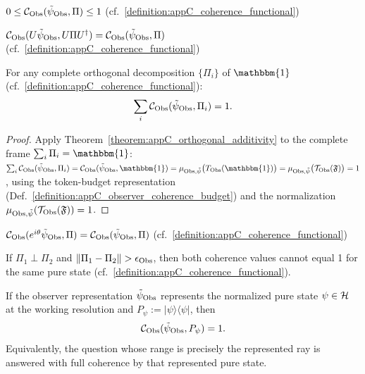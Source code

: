 \begin{axiom}[PS--C1 (Boundedness)]
\label{axiom:appC_psc1}
$0 \leq \mathcal{C}_{\mathrm{Obs}}(\tilde\psi_{\mathrm{Obs}}, \Pi) \leq 1$ \quad (cf.~\ref{definition:appC_coherence_functional})
\end{axiom}

\begin{axiom}
\label{axiom:appC_psc2}
$\mathcal{C}_{\mathrm{Obs}}(U \tilde\psi_{\mathrm{Obs}}, U \Pi U^\dagger)
= \mathcal{C}_{\mathrm{Obs}}(\tilde\psi_{\mathrm{Obs}}, \Pi)$ \quad (cf.~\ref{definition:appC_coherence_functional})
\end{axiom}

\begin{corollary}
\label{axiom:appC_psc3}
For any complete orthogonal decomposition $\{\Pi_i\}$ of $\mathbbm{1}$ (cf.~\ref{definition:appC_coherence_functional}):
\[
\sum_i \mathcal{C}_{\mathrm{Obs}}(\tilde\psi_{\mathrm{Obs}}, \Pi_i) = 1.
\]
\end{corollary}

\begin{proof}
\label{proof:appC_psc3}
Apply Theorem~\ref{theorem:appC_orthogonal_additivity} to the complete frame
$\sum_i \Pi_i = \mathbbm{1}$:
$\sum_i \mathcal{C}_{\Obs}(\tilde\psi_{\Obs}, \Pi_i)
= \mathcal{C}_{\Obs}(\tilde\psi_{\Obs}, \mathbbm{1})
= \mu_{\Obs,\tilde\psi}\big(T_\Obs(\mathbbm{1})\big)
= \mu_{\Obs,\tilde\psi}\big(\mathcal{T}_\Obs(\mathfrak{F})\big) = 1$,
using the token-budget representation
(Def.~\ref{definition:appC_observer_coherence_budget}) and the normalization
$\mu_{\mathrm{Obs},\tilde\psi}(\mathcal{T}_{\mathrm{Obs}}(\mathfrak{F})) = 1$.
\end{proof}

\begin{axiom}
\label{axiom:appC_psc4}
$\mathcal{C}_{\mathrm{Obs}}(e^{i\theta} \tilde\psi_{\mathrm{Obs}}, \Pi)
= \mathcal{C}_{\mathrm{Obs}}(\tilde\psi_{\mathrm{Obs}}, \Pi)$ \quad (cf.~\ref{definition:appC_coherence_functional})
\end{axiom}

\begin{axiom}
\label{axiom:appC_psc5}
If $\Pi_1 \perp \Pi_2$ and $\| \Pi_1 - \Pi_2 \| > \epsilon_{\mathrm{Obs}}$,
then both coherence values cannot equal 1 for the same pure state (cf.~\ref{definition:appC_coherence_functional}).
\end{axiom}

\begin{axiom}
\label{axiom:appC_psc6}
If the observer representation $\tilde\psi_{\mathrm{Obs}}$ represents the normalized pure
state $\psi\in\mathcal{H}$ at the working resolution and
$P_\psi:=|\psi\rangle\langle\psi|$, then
\[
\mathcal{C}_{\mathrm{Obs}}(\tilde\psi_{\mathrm{Obs}},P_\psi)=1.
\]
Equivalently, the question whose range is precisely the represented ray is
answered with full coherence by that represented pure state.
\end{axiom}

